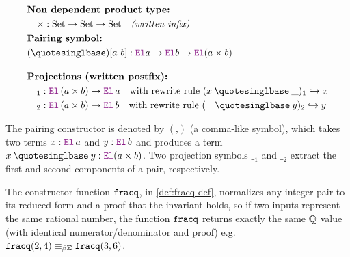 \begin{definition}\label{def-product}
\begin{align*}
&\textbf{Non dependent product type:} \\
&\quad \times : \text{Set} \to \text{Set} \to \text{Set} \quad \textit{(written infix)} \\
&\textbf{Pairing symbol:} \\
&(\mathbin{‚}) [a~b] : \el a \ra \el b \ra \el (a \times b)\\[1em]
&\textbf{Projections (written postfix):}  \\
&\quad {}_1 : \el\, (a \times b) \ra \el\, a \quad \text{with rewrite rule } (x \mathbin{‚} \_)_1 \re x \\
&\quad {}_2 : \el\, (a \times b) \ra \el\, b \quad \text{with rewrite rule } (\_ \mathbin{‚} y)_2 \re y
\end{align*}
\end{definition}

The pairing constructor is denoted by $(‚)$ (a comma-like symbol), which takes two terms $x : \el\,a$ and $y : \el\, b$ and produces a term $x \mathbin{‚} y : \el (a \times b)$.
Two projection symbols ${\_}_1$ and ${\_}_2$ extract the first and second components of a pair, respectively.

The constructor function $\texttt{\upshape{fracq}}$, in \cref{def:fracq-def}, normalizes any integer pair to its reduced form and a proof that the invariant holds, so if two inputs represent the same rational number, 
the function $\texttt{\upshape{fracq}}$ returns exactly the same $\mathbb{Q}$ value (with identical numerator/denominator and proof) e.g. $\texttt{\upshape{fracq}} (2,4) \equiv_{\beta\Sigma} \texttt{\upshape{fracq}} (3,6)$.

